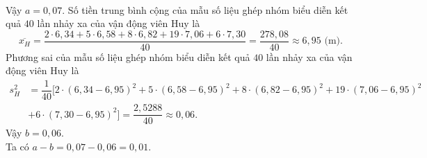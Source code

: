 \begin{bt}
{\begin{align*}
		\end{align*}
		Vậy $a = 0{,}07$.
		Số tiền trung bình cộng của mẫu số liệu ghép nhóm biểu diễn kết quả $40$ lần nhảy xa của vận động viên Huy là
		\[\overline{x_H} = \dfrac{2 \cdot 6{,}34 + 5 \cdot 6{,}58 + 8 \cdot 6{,}82 + 19 \cdot 7{,}06 + 6 \cdot 7{,}30}{40} = \dfrac{278{,}08}{40} \approx 6{,}95 \text{ (m).}\]
		Phương sai của mẫu số liệu ghép nhóm biểu diễn kết quả $40$ lần nhảy xa của vận động viên Huy là 
		\begin{align*}
		s_H^2 &= \dfrac{1}{40} \big[2 \cdot (6{,}34 - 6{,}95)^2 + 5 \cdot (6{,}58 - 6{,}95)^2 + 8 \cdot (6{,}82 - 6{,}95)^2 + 19 \cdot (7{,}06 - 6{,}95)^2\\
		& + 6 \cdot (7{,}30 - 6{,}95)^2 \big] = \dfrac{2{,}5288}{40} \approx 0{,}06.
		\end{align*}
		Vậy $b = 0{,}06$. \\
		Ta có $a - b = 0{,}07 - 0{,}06 = 0{,}01$.
	}
\end{bt}

